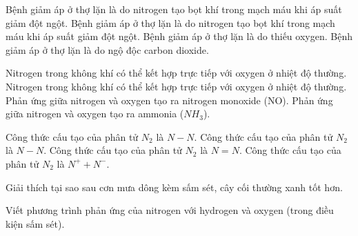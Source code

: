 \begin{ex}
	Bệnh giảm áp ở thợ lặn là do nitrogen tạo bọt khí trong mạch máu khi áp suất giảm đột ngột.
	{\True Bệnh giảm áp ở thợ lặn là do nitrogen tạo bọt khí trong mạch máu khi áp suất giảm đột ngột.}
	{Bệnh giảm áp ở thợ lặn là do thiếu oxygen.}
	{Bệnh giảm áp ở thợ lặn là do ngộ độc carbon dioxide.}
\end{ex}

\begin{ex}
	Nitrogen trong không khí có thể kết hợp trực tiếp với oxygen ở nhiệt độ thường.
	{Nitrogen trong không khí có thể kết hợp trực tiếp với oxygen ở nhiệt độ thường.}
	{\True Phản ứng giữa nitrogen và oxygen tạo ra nitrogen monoxide (NO).}
	{Phản ứng giữa nitrogen và oxygen tạo ra ammonia ($NH_3$).}
\end{ex}

\begin{ex}
	Công thức cấu tạo của phân tử $N_2$ là $N-N$.
	{Công thức cấu tạo của phân tử $N_2$ là $N-N$.}
	{Công thức cấu tạo của phân tử $N_2$ là $N=N$.}
	{Công thức cấu tạo của phân tử $N_2$ là $N^++N^-$.}
\end{ex}


\begin{bt}
	Giải thích tại sao sau cơn mưa dông kèm sấm sét, cây cối thường xanh tốt hơn.
\end{bt}

\begin{bt}
	Viết phương trình phản ứng của nitrogen với hydrogen và oxygen (trong điều kiện sấm sét).
\end{bt}

